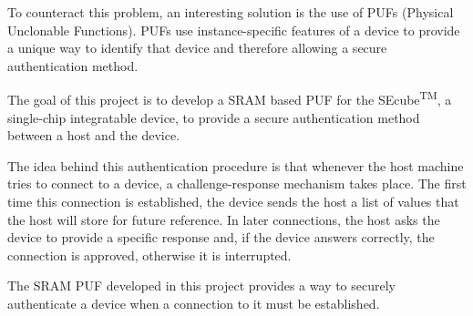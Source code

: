 To counteract this problem, an interesting solution is the use of PUFs (Physical Unclonable Functions). PUFs use instance-specific features of a device to provide a unique way to identify that device and therefore allowing a secure authentication method.

The goal of this project is to develop a SRAM based PUF for the SEcube\textsuperscript{TM}, a single-chip integratable device, to provide a secure authentication method between a host and the device.

The idea behind this authentication procedure is that whenever the host machine tries to connect to a device, a challenge-response mechanism takes place. The first time this connection is established, the device sends the host a list of values that the host will store for future reference. In later connections, the host asks the device to provide a specific response and, if the device answers correctly, the connection is approved, otherwise it is interrupted.


The SRAM PUF developed in this project provides a way to securely authenticate a device when a connection to it must be established. %